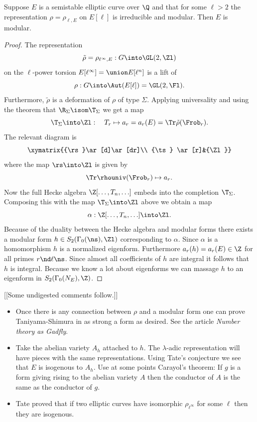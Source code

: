 \documentclass{report}
\begin{document}
\begin{theorem}Suppose $E$ is a
semistable elliptic curve over $\Q$ and that for some $\ell>2$
the representation $\rho=\rho_{\ell,E}$ on $E[\ell]$
is irreducible and modular. Then $E$ is modular.
\end{theorem}
\begin{proof}
The representation
$$\tilde{\rho}=\rho_{\ell^{\infty},E}:G\into\GL(2,\Zl)$$
on the $\ell$-power torsion $E[\ell^{\infty}]=\union E[\ell^n]$ is
a lift of
$$\rho:G\into\Aut(E[\ell])=\GL(2,\Fl).$$
Furthermore, $\tilde{\rho}$ is a deformation of $\rho$ of type $\Sigma$.
Applying universality and using the theorem that
$\R_{\Sigma}\isom\T_{\Sigma}$ we get a map
$$\T_{\Sigma}\into\Zl: \quad T_r\mapsto
         a_r=a_r(E)=\Tr \tilde{\rho}(\Frob_r).$$
The relevant diagram is
$$\xymatrix{{\rs}\ar[d]\ar[dr]\\
      {\ts} \ar[r]&{\Zl}}$$
where the map $\rs\into\Zl$ is given by
$$\Tr \rhouniv (\Frob_r)\mapsto a_r.$$
Now the full Hecke algebra $\Z[\ldots,T_n,\ldots]$ embeds
into the completion $\T_{\Sigma}$. Composing this with
the map $\T_{\Sigma}\into\Zl$ above we obtain a map
$$\alpha:\Z[\ldots,T_n,\ldots]\into\Zl.$$ Because of the
duality between the Hecke algebra and modular forms there
exists a modular form $h\in S_2(\Gamma_0(\ns),\Zl)$
corresponding to $\alpha$. Since $\alpha$ is a homomorphism
$h$ is a normalized eigenform. Furthermore $a_r(h)=a_r(E)\in\Z$
for all primes $r\nd\ell\ns$. Since almost all coefficients
of $h$ are integral it follows that $h$ is integral.
Because we know a lot about eigenforms we can massage $h$ to
an eigenform in $S_2(\Gamma_0(N_{E}),\Z)$.
\end{proof}

[[Some undigested comments follow.]]
\begin{itemize}
\item Once there is any connection between $\rho$ and a modular form
one can prove Taniyama-Shimura in as strong a form as desired.
See the article {\em Number theory as Gadfly}.
\item Take the abelian variety $A_h$ attached to $h$.
The $\lambda$-adic representation will have pieces with the
same representations. Using Tate's conjecture we see that $E$
is isogenous to $A_h$. Use at some points Carayol's theorem:
If $g$ is a form giving rising to the abelian variety $A$ then
the conductor of $A$ is the same as the conductor of $g$.
\item Tate proved that if two elliptic curves have isomorphic
$\rho_{\ell^{\infty}}$ for some $\ell$ then they are isogenous.
\end{itemize}
\end{document}
